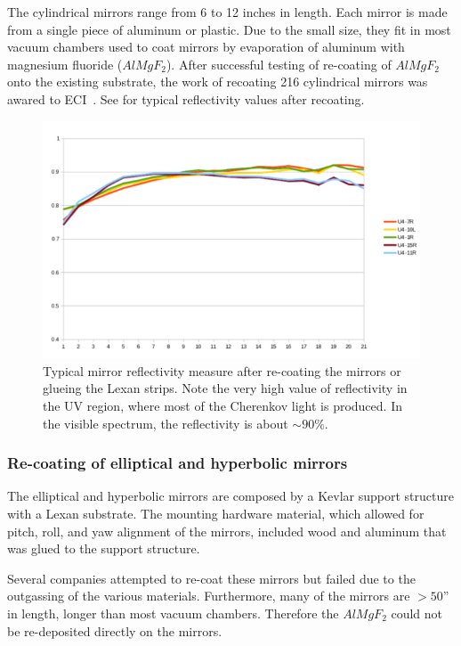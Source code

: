The cylindrical mirrors range from 6 to 12 inches in length. Each mirror is made from a single piece of aluminum or plastic.
Due to the small size, they fit in most vacuum chambers used to coat mirrors by evaporation of aluminum with magnesium fluoride
($AlMgF_2$). After successful testing of re-coating of $AlMgF_2$ onto the existing substrate, the work of recoating 216 cylindrical mirrors
was awared to ECI~\cite{ECI}. See  for typical reflectivity values after recoating.

\begin{figure}[h]
	\centering
	\includegraphics[width=0.95\columnwidth,keepaspectratio]{img/mirrorsReflectivityAfter.png}
	\caption{Typical mirror reflectivity measure after re-coating the mirrors or glueing the Lexan strips. Note the very high value of reflectivity
		     in the UV region, where most of the Cherenkov light is produced. In the visible spectrum, the reflectivity is about $\sim 90\%$.}
	\label{fig:reflectivityAfter}
\end{figure}

\subsubsection{Re-coating of elliptical and hyperbolic mirrors}

The elliptical and hyperbolic mirrors are composed by a Kevlar support structure with a Lexan substrate. The mounting hardware
material, which allowed for pitch, roll, and yaw alignment of the mirrors, included wood and aluminum that was glued to the support structure.

Several companies attempted to re-coat these mirrors but failed due to the outgassing of the various materials. Furthermore, many of the mirrors
are $> 50$'' in length, longer than most vacuum chambers. Therefore the $AlMgF_2$ could not be re-deposited directly on the mirrors.

